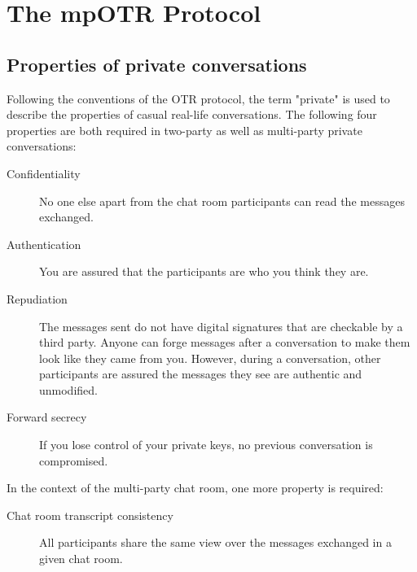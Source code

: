 \chapter{The mpOTR Protocol}
\label{chapters:protocol}

\section{Properties of private conversations}
Following the conventions of the OTR protocol, the term "private" is used to describe the properties of casual real-life conversations. The following four properties are both required in two-party as well as multi-party private conversations:
\begin{description}
\item[Confidentiality] No one else apart from the chat room participants can read the messages exchanged.
\item[Authentication] You are assured that the participants are who you think they are.
\item[Repudiation] The messages sent do not have digital signatures that are checkable by a third party. Anyone can forge messages after a conversation to make them look like they came from you. However, during a conversation, other participants are assured the messages they see are authentic and unmodified. 
\item[Forward secrecy] If you lose control of your private keys, no previous conversation is compromised.
\end{description}

In the context of the multi-party chat room, one more property is required:
\begin{description}
\item[Chat room transcript consistency] All participants share the same view over the messages exchanged in a given chat room.
\end{description}


